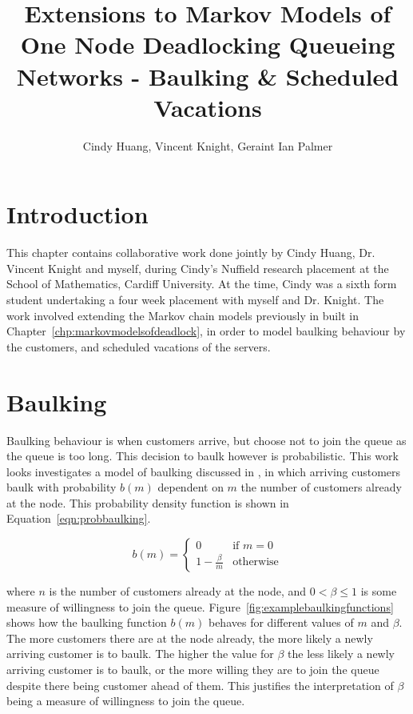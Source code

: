 \documentclass{article}
\title{Extensions to Markov Models of One Node Deadlocking Queueing Networks - Baulking \& Scheduled Vacations}
\author{Cindy Huang, Vincent Knight, Geraint Ian Palmer}
\date{}
\begin{document}
\onehalfspacing

\maketitle

\section{Introduction}

This chapter contains collaborative work done jointly by Cindy Huang, Dr. Vincent Knight and myself, during Cindy's Nuffield research placement \cite{nuffieldresearchplacements} at the School of Mathematics, Cardiff University.
At the time, Cindy was a sixth form student undertaking a four week placement with myself and Dr. Knight.
The work involved extending the Markov chain models previously in built in Chapter~\ref{chp:markovmodelsofdeadlock}, in order to model baulking behaviour by the customers, and scheduled vacations of the servers.


\section{Baulking}

Baulking behaviour is when customers arrive, but choose not to join the queue as the queue is too long.
This decision to baulk however is probabilistic. %
This work looks investigates a model of baulking discussed in \cite{anckergafarian63}, in which arriving customers baulk with probability $b(m)$ dependent on $m$ the number of customers already at the node.
This probability density function is shown in Equation~\ref{eqn:probbaulking}.

\begin{equation}\label{eqn:probbaulking}
    b(m) = \left\{ \begin{array}{rr}
    0 & \text{if } m = 0\\
    1 - \frac{\beta}{m} & \text{otherwise}
    \end{array} \right.
\end{equation}

where $n$ is the number of customers already at the node, and $0 < \beta \leq 1$ is some measure of willingness to join the queue.
Figure~\ref{fig:examplebaulkingfunctions} shows how the baulking function $b(m)$ behaves for different values of $m$ and $\beta$.
The more customers there are at the node already, the more likely a newly arriving customer is to baulk.
The higher the value for $\beta$ the less likely a newly arriving customer is to baulk, or the more willing they are to join the queue despite there being customer ahead of them.
This justifies the interpretation of $\beta$ being a measure of willingness to join the queue.
\end{document}
